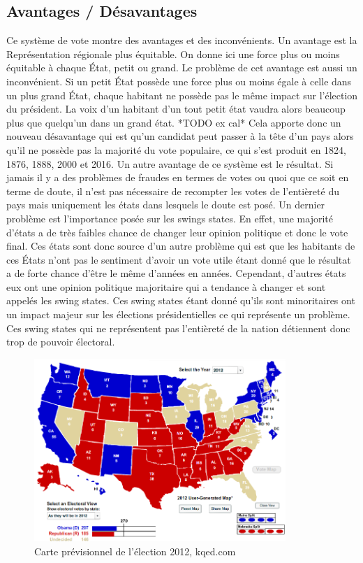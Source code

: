 \documentclass[12pt,a4paper]{report}
\begin{document}
\subsection{Avantages / Désavantages} %
Ce système de vote montre des avantages et des inconvénients.
Un avantage est la Représentation régionale plus équitable.
On donne ici une force plus ou moins équitable à chaque État, petit ou grand.
Le problème de cet avantage est aussi un inconvénient.
Si un petit État possède une force plus ou moins égale à celle dans un plus grand État, chaque habitant ne possède pas le même impact sur l'élection du président.
La voix d’un habitant d’un tout petit état vaudra alors beaucoup plus que quelqu’un dans un grand état. *TODO ex cal*
Cela apporte donc un nouveau désavantage qui est qu’un candidat peut passer à la tête d’un pays alors qu’il ne possède pas la majorité du vote populaire, ce qui s’est produit en 1824, 1876, 1888, 2000 et 2016.
Un autre avantage de ce système est le résultat.
Si jamais il y a des problèmes de fraudes en termes de votes ou quoi que ce soit en terme de doute, il n’est pas nécessaire de recompter les votes de l'entièreté du pays mais uniquement les états dans lesquels le doute est posé.
Un dernier problème est l’importance posée sur les swings states.
En effet, une majorité d’états a de très faibles chance de changer leur opinion politique et donc le vote final.
Ces états sont donc source d’un autre problème qui est que les habitants de ces États n’ont pas le sentiment d’avoir un vote utile étant donné que le résultat a de forte chance d’être le même d’années en années.
Cependant, d’autres états eux ont une opinion politique majoritaire qui a tendance à changer et sont appelés les swing states.
Ces swing states étant donné qu’ils sont minoritaires ont un impact majeur sur les élections présidentielles ce qui représente un problème.
Ces swing states qui ne représentent pas l'entièreté de la nation détiennent donc trop de pouvoir électoral.
\nocite{greelane:eleccoll}
\nocite{gov:fedpapers68}

\begin{figure}[h]
	\centering
	\includegraphics[width=0.85\textwidth]{./images/2012-election.png}
	\caption{Carte prévisionnel de l'élection 2012, kqed.com \cite{kqed:map}}
	\label{map:uselec2012}
\end{figure}
\end{document}
